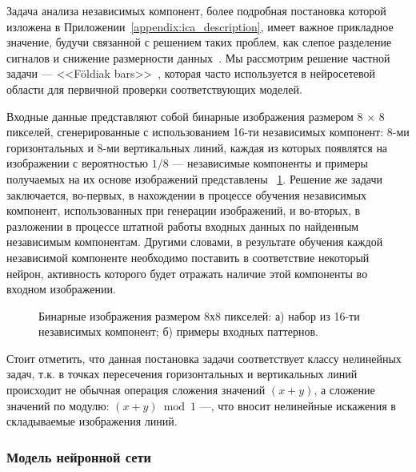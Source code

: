 Задача анализа независимых компонент, более подробная постановка которой изложена в Приложении~\ref{appendix:ica_description}, имеет важное прикладное значение, будучи связанной с решением таких проблем, как слепое разделение сигналов и снижение размерности данных~\cite{Hyvarinen2004}. Мы рассмотрим решение частной задачи  --- <<F{\"o}ldiak bars>>~\cite{Foldiak1990}, которая часто используется в нейросетевой области для первичной проверки соответствующих моделей.

Входные данные представляют собой бинарные изображения размером $8\,\times\,8$ пикселей, сгенерированные с использованием 16-ти независимых компонент: 8-ми горизонтальных и 8-ми вертикальных линий, каждая из которых появлятся на изображении с вероятностью $1/8$ --- независимые компоненты и примеры получаемых на их основе изображений представлены \onfigure~\ref{img:ica_patterns}. Решение же задачи заключается, во-первых, в нахождении в процессе обучения независимых компонент, использованных при генерации изображений, и во-вторых, в разложении в процессе штатной работы входных данных по найденным независимым компонентам. Другими словами, в результате обучения каждой независимой компоненте необходимо поставить в соответствие некоторый нейрон, активность которого будет отражать наличие этой компоненты во входном изображении.

\begin{figure}[ht]
    \caption{Бинарные изображения размером 8х8 пикселей: а) набор из 16-ти независимых компонент; б) примеры входных паттернов.}
    \label{img:ica_patterns}
\end{figure}

Стоит отметить, что данная постановка задачи соответствует классу нелинейных задач, т.к. в точках пересечения горизонтальных и вертикальных линий происходит не обычная операция сложения значений $(x + y)$, а сложение значений по модулю: $(x + y) \bmod 1$ ---, что вносит нелинейные искажения в складываемые изображения линий.

\subsubsection{Модель нейронной сети}

